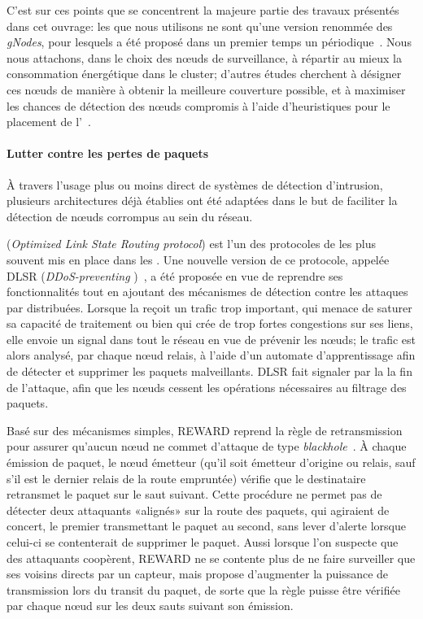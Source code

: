 C'est sur ces points que se concentrent la majeure partie des travaux présentés dans cet ouvrage: les \cns que nous utilisons ne sont qu'une version renommée des \textit{gNodes}, pour lesquels a été proposé dans un premier temps un  périodique~\cite{GMT12}.
Nous nous attachons, dans le choix des nœuds de surveillance, à répartir au mieux la consommation énergétique dans le cluster; d'autres études cherchent à désigner ces nœuds de manière à obtenir la meilleure couverture possible, et à maximiser les chances de détection des nœuds compromis à l'aide d'heuristiques pour le placement de l'\IDS~\cite{INK09}.

        \paragraph{Lutter contre les pertes de paquets}
À travers l'usage plus ou moins direct de systèmes de détection d'intrusion, plusieurs architectures déjà établies ont été adaptées dans le but de faciliter la détection de nœuds corrompus au sein du réseau.

\olsr (\textit{Optimized Link State Routing protocol}) est l'un des protocoles de  les plus souvent mis en place dans les \rcs.
Une nouvelle version de ce protocole, appelée DLSR (\textit{DDoS-preventing \olsr})~\cite{MKASF10}, a été proposée en vue de reprendre ses fonctionnalités tout en ajoutant des mécanismes de détection contre les attaques par \dds distribuées.
Lorsque la \sdb reçoit un trafic trop important, qui menace de saturer sa capacité de traitement ou bien qui crée de trop fortes congestions sur ses liens, elle envoie un signal dans tout le réseau en vue de prévenir les nœuds; le trafic est alors analysé, par chaque nœud relais, à l'aide d'un automate d'apprentissage afin de détecter et supprimer les paquets malveillants.
DLSR fait signaler par la \sdb la fin de l'attaque, afin que les nœuds cessent les opérations nécessaires au filtrage des paquets.

Basé sur des mécanismes simples, REWARD reprend la règle de retransmission pour assurer qu'aucun nœud ne commet d'attaque de type \textit{blackhole}~\cite{Kar05}.
À chaque émission de paquet, le nœud émetteur (qu'il soit émetteur d'origine ou relais, sauf s'il est le dernier relais de la route empruntée) vérifie que le destinataire retransmet le paquet sur le saut suivant.
Cette procédure ne permet pas de détecter deux attaquants «alignés» sur la route des paquets, qui agiraient de concert, le premier transmettant le paquet au second, sans lever d'alerte lorsque celui-ci se contenterait de supprimer le paquet.
Aussi lorsque l'on suspecte que des attaquants coopèrent, REWARD ne se contente plus de ne faire surveiller que ses voisins directs par un capteur, mais propose d'augmenter la puissance de transmission lors du transit du paquet, de sorte que la règle puisse être vérifiée par chaque nœud sur les deux sauts suivant son émission.

